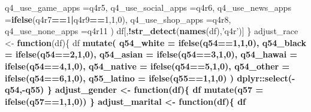 \documentclass[]{article}
\newenvironment{Shaded}{\begin{snugshade}}{\end{snugshade}}
\newcommand{\KeywordTok}[1]{\textcolor[rgb]{0.13,0.29,0.53}{\textbf{#1}}}
\newcommand{\DataTypeTok}[1]{\textcolor[rgb]{0.13,0.29,0.53}{#1}}
\newcommand{\DecValTok}[1]{\textcolor[rgb]{0.00,0.00,0.81}{#1}}
\newcommand{\StringTok}[1]{\textcolor[rgb]{0.31,0.60,0.02}{#1}}
\newcommand{\ControlFlowTok}[1]{\textcolor[rgb]{0.13,0.29,0.53}{\textbf{#1}}}
\newcommand{\OperatorTok}[1]{\textcolor[rgb]{0.81,0.36,0.00}{\textbf{#1}}}
\newcommand{\NormalTok}[1]{#1}
\begin{document}
\begin{Shaded}
\begin{Highlighting}[]
{{{{{{{      \DataTypeTok{q4_use_game_apps =}\NormalTok{q4r5,}
      \DataTypeTok{q4_use_social_apps =}\NormalTok{q4r6,}
      \DataTypeTok{q4_use_news_apps =}\KeywordTok{ifelse}\NormalTok{(q4r7}\OperatorTok{==}\DecValTok{1}\OperatorTok{|}\NormalTok{q4r9}\OperatorTok{==}\DecValTok{1}\NormalTok{,}\DecValTok{1}\NormalTok{,}\DecValTok{0}\NormalTok{),}
      \DataTypeTok{q4_use_shop_apps =}\NormalTok{q4r8,}
      \DataTypeTok{q4_use_none_apps =}\NormalTok{q4r11}
\NormalTok{    )}
\NormalTok{  df[,}\OperatorTok{!}\KeywordTok{str_detect}\NormalTok{(}\KeywordTok{names}\NormalTok{(df),}\StringTok{'q4r'}\NormalTok{)]}
\NormalTok{\}}
\NormalTok{adjust_race <-}\StringTok{ }\ControlFlowTok{function}\NormalTok{(df)\{}
\NormalTok{  df }\OperatorTok{%>%}\StringTok{ }
\StringTok{    }\KeywordTok{mutate}\NormalTok{(}
      \DataTypeTok{q54_white  =} \KeywordTok{ifelse}\NormalTok{(q54}\OperatorTok{==}\DecValTok{1}\NormalTok{,}\DecValTok{1}\NormalTok{,}\DecValTok{0}\NormalTok{),}
      \DataTypeTok{q54_black  =} \KeywordTok{ifelse}\NormalTok{(q54}\OperatorTok{==}\DecValTok{2}\NormalTok{,}\DecValTok{1}\NormalTok{,}\DecValTok{0}\NormalTok{),}
      \DataTypeTok{q54_asian  =} \KeywordTok{ifelse}\NormalTok{(q54}\OperatorTok{==}\DecValTok{3}\NormalTok{,}\DecValTok{1}\NormalTok{,}\DecValTok{0}\NormalTok{),}
      \DataTypeTok{q54_hawai  =} \KeywordTok{ifelse}\NormalTok{(q54}\OperatorTok{==}\DecValTok{4}\NormalTok{,}\DecValTok{1}\NormalTok{,}\DecValTok{0}\NormalTok{),}
      \DataTypeTok{q54_native =}  \KeywordTok{ifelse}\NormalTok{(q54}\OperatorTok{==}\DecValTok{5}\NormalTok{,}\DecValTok{1}\NormalTok{,}\DecValTok{0}\NormalTok{),}
      \DataTypeTok{q54_other  =} \KeywordTok{ifelse}\NormalTok{(q54}\OperatorTok{==}\DecValTok{6}\NormalTok{,}\DecValTok{1}\NormalTok{,}\DecValTok{0}\NormalTok{),}
      \DataTypeTok{q55_latino =}  \KeywordTok{ifelse}\NormalTok{(q55}\OperatorTok{==}\DecValTok{1}\NormalTok{,}\DecValTok{1}\NormalTok{,}\DecValTok{0}\NormalTok{)}
\NormalTok{    ) }\OperatorTok{%>%}\StringTok{ }
\StringTok{    }\NormalTok{dplyr}\OperatorTok{::}\KeywordTok{select}\NormalTok{(}\OperatorTok{-}\NormalTok{q54,}\OperatorTok{-}\NormalTok{q55)}
\NormalTok{\}}
\NormalTok{adjust_gender <-}\StringTok{ }\ControlFlowTok{function}\NormalTok{(df)\{}
\NormalTok{  df }\OperatorTok{%>%}\StringTok{ }
\StringTok{    }\KeywordTok{mutate}\NormalTok{(}\DataTypeTok{q57 =} \KeywordTok{ifelse}\NormalTok{(q57}\OperatorTok{==}\DecValTok{1}\NormalTok{,}\DecValTok{1}\NormalTok{,}\DecValTok{0}\NormalTok{))}
\NormalTok{\}}
\NormalTok{adjust_marital <-}\StringTok{ }\ControlFlowTok{function}\NormalTok{(df)\{}
\NormalTok{  df }\OperatorTok{%>%}\StringTok{ }
}}}}}}}}}}}
\end{Highlighting}
\end{Shaded}
\end{document}
